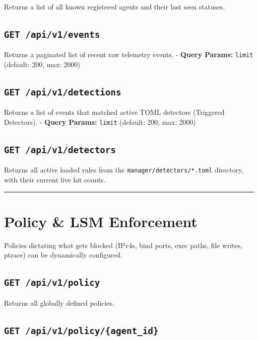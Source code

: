 \documentclass[
  12pt,
]{report}
\begin{document}
Returns a list of all known registered agents and their last seen
statuses.

\subsection{\texorpdfstring{\texttt{GET\ /api/v1/events}}{GET /api/v1/events}}\label{get-apiv1events}

Returns a paginated list of recent raw telemetry events. - \textbf{Query
Params:} \texttt{limit} (default: 200, max: 2000)

\subsection{\texorpdfstring{\texttt{GET\ /api/v1/detections}}{GET /api/v1/detections}}\label{get-apiv1detections}

Returns a list of events that matched active TOML detectors (Triggered
Detectors). - \textbf{Query Params:} \texttt{limit} (default: 200, max:
2000)

\subsection{\texorpdfstring{\texttt{GET\ /api/v1/detectors}}{GET /api/v1/detectors}}\label{get-apiv1detectors}

Returns all active loaded rules from the
\texttt{manager/detectors/*.toml} directory, with their current live hit
counts.

\begin{center}\rule{0.5\linewidth}{0.5pt}\end{center}

\section{Policy \& LSM Enforcement}\label{policy-lsm-enforcement}

Policies dictating what gets blocked (IPv4s, bind ports, exec paths,
file writes, ptrace) can be dynamically configured.

\subsection{\texorpdfstring{\texttt{GET\ /api/v1/policy}}{GET /api/v1/policy}}\label{get-apiv1policy}

Returns all globally defined policies.

\subsection{\texorpdfstring{\texttt{GET\ /api/v1/policy/\{agent\_id\}}}{GET /api/v1/policy/\{agent\_id\}}}\label{get-apiv1policyagent_id}
\end{document}
